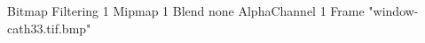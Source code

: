 {Bitmap
	{Filtering 1}
	{Mipmap 1}
	{Blend none}
	{AlphaChannel 1}
	{Frame "window-cath33.tif.bmp"}
}
